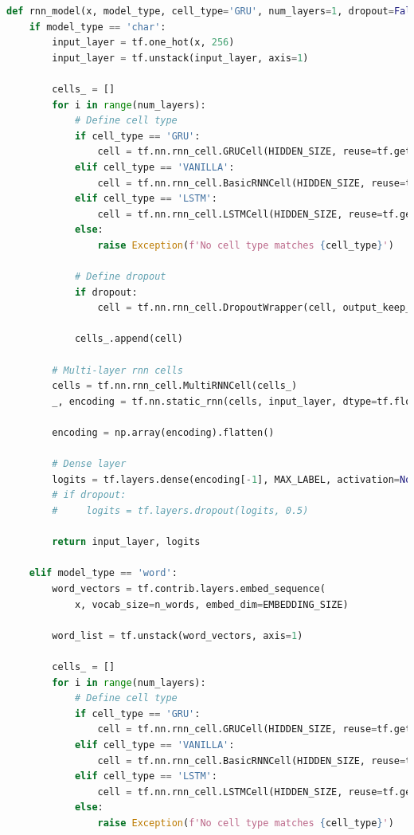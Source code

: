 \begin{lstlisting}[language=Python, caption= Character and word recurrent neural network neural network (layers controlled by layers parameter), label=ls:2_rnn]
def rnn_model(x, model_type, cell_type='GRU', num_layers=1, dropout=False):
    if model_type == 'char':
        input_layer = tf.one_hot(x, 256)
        input_layer = tf.unstack(input_layer, axis=1)

        cells_ = []
        for i in range(num_layers):
            # Define cell type
            if cell_type == 'GRU':
                cell = tf.nn.rnn_cell.GRUCell(HIDDEN_SIZE, reuse=tf.get_variable_scope().reuse)
            elif cell_type == 'VANILLA':
                cell = tf.nn.rnn_cell.BasicRNNCell(HIDDEN_SIZE, reuse=tf.get_variable_scope().reuse)
            elif cell_type == 'LSTM':
                cell = tf.nn.rnn_cell.LSTMCell(HIDDEN_SIZE, reuse=tf.get_variable_scope().reuse)
            else:
                raise Exception(f'No cell type matches {cell_type}')

            # Define dropout
            if dropout:
                cell = tf.nn.rnn_cell.DropoutWrapper(cell, output_keep_prob=0.5)

            cells_.append(cell)

        # Multi-layer rnn cells
        cells = tf.nn.rnn_cell.MultiRNNCell(cells_)
        _, encoding = tf.nn.static_rnn(cells, input_layer, dtype=tf.float32)

        encoding = np.array(encoding).flatten()

        # Dense layer
        logits = tf.layers.dense(encoding[-1], MAX_LABEL, activation=None)
        # if dropout:
        #     logits = tf.layers.dropout(logits, 0.5)

        return input_layer, logits

    elif model_type == 'word':
        word_vectors = tf.contrib.layers.embed_sequence(
            x, vocab_size=n_words, embed_dim=EMBEDDING_SIZE)

        word_list = tf.unstack(word_vectors, axis=1)

        cells_ = []
        for i in range(num_layers):
            # Define cell type
            if cell_type == 'GRU':
                cell = tf.nn.rnn_cell.GRUCell(HIDDEN_SIZE, reuse=tf.get_variable_scope().reuse)
            elif cell_type == 'VANILLA':
                cell = tf.nn.rnn_cell.BasicRNNCell(HIDDEN_SIZE, reuse=tf.get_variable_scope().reuse)
            elif cell_type == 'LSTM':
                cell = tf.nn.rnn_cell.LSTMCell(HIDDEN_SIZE, reuse=tf.get_variable_scope().reuse)
            else:
                raise Exception(f'No cell type matches {cell_type}')


\end{lstlisting}
